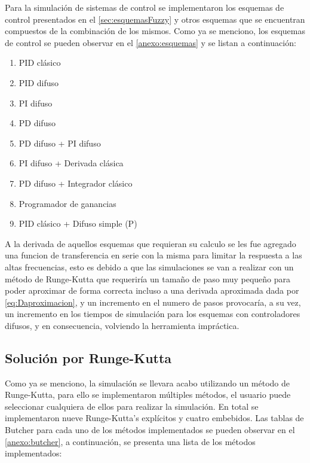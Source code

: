         Para la simulación de sistemas de control se implementaron los esquemas de control presentados en el \cref{sec:esquemasFuzzy} y otros esquemas que se encuentran compuestos de la combinación de los mismos. Como ya se menciono, los esquemas de control se pueden observar en el \ref{anexo:esquemas} y se listan a continuación:

        \begin{enumerate}[leftmargin=\parindent]
            \item PID clásico
            \item PID difuso
            \item PI difuso
            \item PD difuso
            \item PD difuso + PI difuso
            \item PI difuso + Derivada clásica
            \item PD difuso + Integrador clásico
            \item Programador de ganancias
            \item PID clásico + Difuso simple (P)
        \end{enumerate}

        A la derivada de aquellos esquemas que requieran su calculo se les fue agregado una funcion de transferencia en serie con la misma para limitar la respuesta a las altas frecuencias, esto es debido a que las simulaciones se van a realizar con un método de Runge-Kutta que requeriría un tamaño de paso muy pequeño para poder aproximar de forma correcta incluso a una derivada aproximada dada por \cref{eq:Daproximacion}, y un incremento en el numero de pasos provocaría, a su vez, un incremento en los tiempos de simulación para los esquemas con controladores difusos, y en consecuencia, volviendo la herramienta impráctica.

    \subsection{Solución por Runge-Kutta}

        Como ya se menciono, la simulación se llevara acabo utilizando un método de Runge-Kutta, para ello se implementaron múltiples métodos, el usuario puede seleccionar cualquiera de ellos para realizar la simulación. En total se implementaron nueve Runge-Kutta's explícitos y cuatro embebidos. Las tablas de Butcher para cada uno de los métodos implementados se pueden observar en el \ref{anexo:butcher}, a continuación, se presenta una lista de los métodos implementados:

